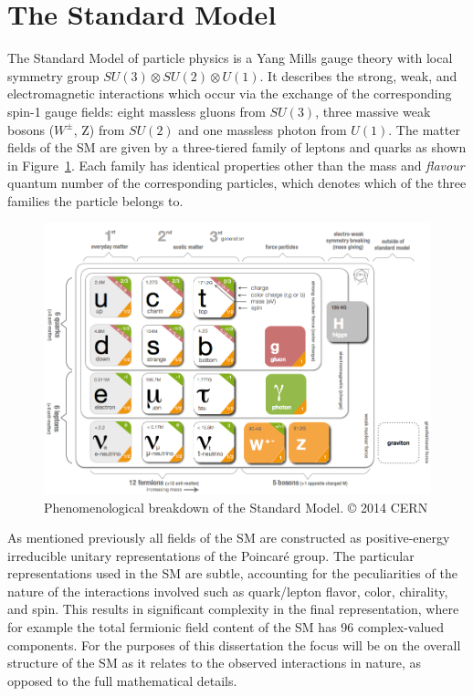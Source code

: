 \section{The Standard Model}
The Standard Model of particle physics is a Yang Mills gauge theory with local symmetry group $SU(3) \otimes SU(2) \otimes U(1)$.
It describes the strong, weak, and electromagnetic interactions which occur via the exchange of the corresponding spin-1 gauge fields: eight massless gluons from $SU(3)$, three massive weak bosons ($W^\pm$, Z) from $SU(2)$ and one massless photon from $U(1)$.
The matter fields of the SM are given by a three-tiered family of leptons and quarks as shown in Figure~\ref{fig:sm_breakdown}.
Each family has identical properties other than the mass and \textit{flavour} quantum number of the corresponding particles, which denotes which of the three families the particle belongs to.

\begin{figure}[h]
   \centering
    \includegraphics[width=\textwidth]{SMdiagram}
    \caption{Phenomenological breakdown of the Standard Model. © 2014 CERN}
	\label{fig:sm_breakdown}
\end{figure}

As mentioned previously all fields of the SM are constructed as positive-energy irreducible unitary representations of the Poincar\'{e} group.
The particular representations used in the SM are subtle, accounting for the peculiarities of the nature of the interactions involved such as quark/lepton flavor, color, chirality, and spin.
This results in significant complexity in the final representation, where for example the total fermionic field content of the SM has 96 complex-valued components.
For the purposes of this dissertation the focus will be on the overall structure of the SM as it relates to the observed interactions in nature, as opposed to the full mathematical details.

